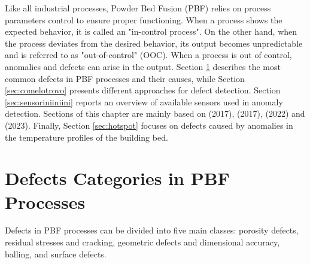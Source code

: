 Like all industrial processes, Powder Bed Fusion (PBF) relies on process parameters control to ensure proper functioning. When a process shows the expected behavior, it is called an "in-control process". On the other hand, when the process deviates from the desired behavior, its output becomes unpredictable and is referred to as "out-of-control" (OOC). When a process is out of control, anomalies and defects can arise in the output. Section \ref{sec:defects} describes the most common defects in PBF processes and their causes, while Section \ref{sec:comelotrovo} presents different approaches for defect detection. Section \ref{sec:sensoriniiniini} reports an overview of available sensors used in anomaly detection.  Sections of this chapter are mainly based on \citeauthor{grasso_-process_2017} (2017), \citeauthor{grasso_process_2017} (2017), \citeauthor{mostafaei_defects_2022} (2022) and \citeauthor{wu_additively_2023} (2023). Finally, Section \ref{sec:hotspot} focuses on defects caused by anomalies in the temperature profiles of the building bed.

\section{Defects Categories in PBF Processes}
\label{sec:defects}
Defects in PBF processes can be divided into five main classes: porosity defects, residual stresses and cracking, geometric defects and dimensional accuracy, balling, and surface defects.
